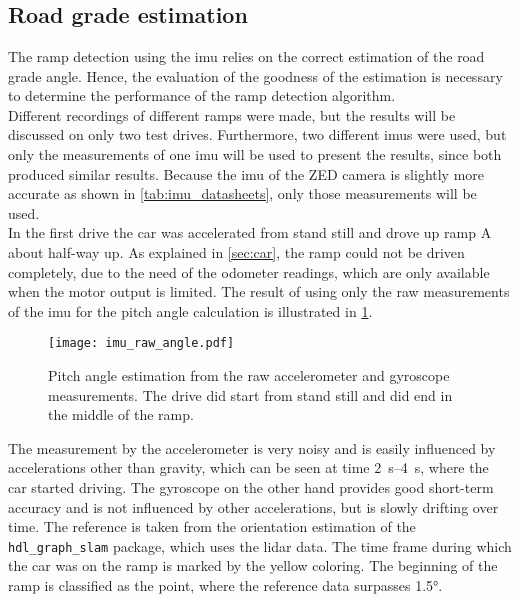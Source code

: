\section{}

\subsection{Road grade estimation}
The ramp detection using the \gls{imu} relies on the correct estimation of the road grade angle.
Hence, the evaluation of the goodness of the estimation is necessary to determine the performance of the ramp detection algorithm.\\
Different recordings of different ramps were made, but the results will be discussed on only two test drives.
Furthermore, two different \glspl{imu} were used, but only the measurements of one \gls{imu} will be used to present the results, since both produced similar results.
Because the \gls{imu} of the ZED camera is slightly more accurate as shown in \cref{tab:imu_datasheets}, only those measurements will be used.\\
In the first drive the car was accelerated from stand still and drove up ramp A about half-way up.
As explained in \cref{sec:car}, the ramp could not be driven completely, due to the need of the odometer readings, which are only available when the motor output is limited.
The result of using only the raw measurements of the \gls{imu} for the pitch angle calculation is illustrated in \cref{fig:imu_raw_angle}.
\begin{figure}[htb]
	\centering
	\texttt{[image: imu\_raw\_angle.pdf]}
	\caption[Angle estimation using raw measurements]{Pitch angle estimation from the raw accelerometer and gyroscope measurements. The drive did start from stand still and did end in the middle of the ramp.}
	\label{fig:imu_raw_angle}
\end{figure}
The measurement by the accelerometer is very noisy and is easily influenced by accelerations other than gravity, which can be seen at time \SIrange{2}{4}{\second}, where the car started driving.
The gyroscope on the other hand provides good short-term accuracy and is not influenced by other accelerations, but is slowly drifting over time.
The reference is taken from the orientation estimation of the \texttt{hdl\_graph\_slam} package, which uses the \gls{lidar} data.
The time frame during which the car was on the ramp is marked by the yellow coloring.
The beginning of the ramp is classified as the point, where the reference data surpasses \ang{1.5}.\\
